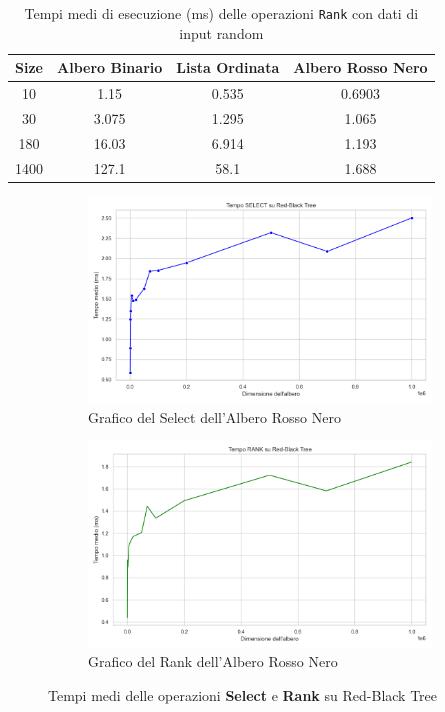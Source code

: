 \documentclass[10pt]{article}
\begin{document}
\begin{table}[H]
\centering
\begin{tabular}{|c|c|c|c|}
\hline
\textbf{Size} & \textbf{Albero Binario} & \textbf{Lista Ordinata} & \textbf{Albero Rosso Nero} \\
\hline
10     & 1.15 & 0.535 & 0.6903 \\
30     & 3.075 & 1.295  & 1.065 \\
180    & 16.03 & 6.914  & 1.193 \\
1400   & 127.1 & 58.1   & 1.688 \\
\hline
\end{tabular}
\caption{Tempi medi di esecuzione (ms) delle operazioni \texttt{Rank} con dati di input random}
\label{tab:confronto_rank_random}
\end{table}
\begin{figure}[H]
    \centering
    \begin{subfigure}{0.49\textwidth}
        \centering
        \includegraphics[width=\linewidth]{plots/RBTLarge/select.png}
        \caption{Grafico del Select dell'Albero Rosso Nero}
        \label{select-rn}
    \end{subfigure}
    \hfill
    \begin{subfigure}{0.49\textwidth}
        \centering
        \includegraphics[width=\linewidth]{plots/RBTLarge/rank.png}
        \caption{Grafico del Rank dell'Albero Rosso Nero}
        \label{rank-rn}
    \end{subfigure}
    \caption{Tempi medi delle operazioni \textbf{Select} e \textbf{Rank} su Red-Black Tree}
    \label{fig:AlberoRNDettagliato}
\end{figure}
\end{document}
